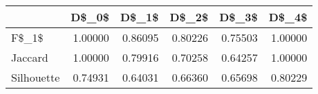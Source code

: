 \begin{table}
\centering
\caption{}
\label{}
\begin{tabular}{lrrrrr}
\toprule
{} &   D\$\_0\$ &   D\$\_1\$ &   D\$\_2\$ &   D\$\_3\$ &   D\$\_4\$ \\
\midrule
F\$\_1\$      & 1.00000 & 0.86095 & 0.80226 & 0.75503 & 1.00000 \\
Jaccard    & 1.00000 & 0.79916 & 0.70258 & 0.64257 & 1.00000 \\
Silhouette & 0.74931 & 0.64031 & 0.66360 & 0.65698 & 0.80229 \\
\bottomrule
\end{tabular}
\end{table}
